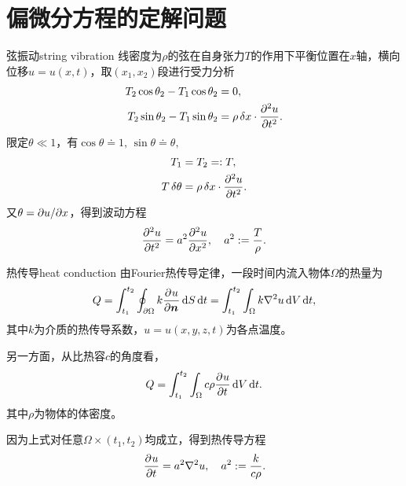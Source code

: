 \chapter{偏微分方程的定解问题}
\begin{example}{弦振动}{string vibration}
	线密度为$\rho$的弦在自身张力$T$的作用下平衡位置在$x$轴，横向位移$u=u(x,t)$，取$(x_1,x_2)$段进行受力分析
	\begin{align*}
		T_2\cos\theta_2-T_1\cos\theta_2&=0,\\
		T_2\sin\theta_2-T_1\sin\theta_2&=\rho\vd x\cdot\pv[2]ut.
	\end{align*}
	限定$\theta\ll 1$，有$\cos\theta\doteq 1,\,\sin\theta\doteq\theta,$
	\begin{align*}
		T_1&=T_2=:T,\\
		T\vd\theta&=\rho\vd x\cdot\pv[2]ut.
	\end{align*}
	又$\theta=\p u/\p x$，得到波动方程
	\begin{align}
		\pv[2]ut=a^2\pv[2]ux,\quad a^2:=\frac T\rho.
	\end{align}
\end{example}
\begin{example}{热传导}{heat conduction}
	由Fourier热传导定律，一段时间内流入物体$\Omega$的热量为
	\[
		Q=\int_{t_1}^{t_2}\oint_{\p\Omega}k\pv u{\bm n}\d S\d t=\int_{t_1}^{t_2}\int_\Omega k\lap u\d V\d t,
	\]
	其中$k$为介质的热传导系数，$u=u(x,y,z,t)$为各点温度。
	
	另一方面，从比热容$c$的角度看，
	\[
		Q=\int_{t_1}^{t_2}\int_\Omega c\rho\pv ut\d V\d t.
	\]
	其中$\rho$为物体的体密度。
	
	因为上式对任意$\Omega\times(t_1,t_2)$均成立，得到热传导方程
	\begin{align}
		\pv ut=a^2\lap u,\quad a^2:=\frac k{c\rho}.
	\end{align}
\end{example}
\iffalse
	\begin{example}{Maxwell方程组}{}
		电动力学中
		\begin{align*}
			\nabla\cdot\bm D  & =\rho,              \\
			\nabla\cdot\bm B  & =0,                 \\
			\nabla\times\bm E & =-\pv{\bm B}t,      \\
			\nabla\times\bm H & =\bm J+\pv{\bm D}t.
		\end{align*}
	\end{example}
\fi

